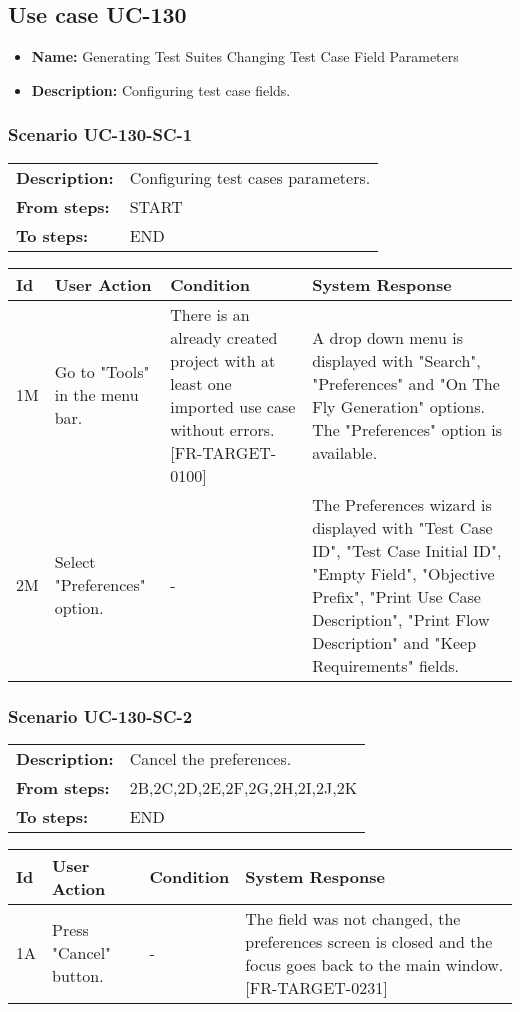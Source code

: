 \documentclass[a4paper,11pt]{article}
\newcommand{\bl}{\\ \hline}
\begin{document}
\subsection*{Use case UC-130}
\begin{itemize}
\item {\bf Name: }Generating Test Suites Changing Test Case Field Parameters
\item {\bf Description: }Configuring test case fields.
\end{itemize}
\subsubsection*{Scenario UC-130-SC-1}
\begin{tabular}{p{1in}p{4in}}
{\bf Description:} & Configuring test cases parameters. \\
{\bf From steps:} & START \\
{\bf To steps:} & END \\
\end{tabular}
 
\begin{tabular}{|p{0.8in}|p{1.6in}|p{1.6in}|p{1.6in}|}
\hline
Id & User Action & Condition & System Response  \bl 
1M & Go to "Tools" in the menu bar. & There is an already created project with at least one imported use case without errors. [FR-TARGET-0100] & A drop down menu is displayed with "Search", "Preferences" and "On The Fly Generation" options. The "Preferences" option is available. \bl 
2M & Select "Preferences" option. & - & The Preferences wizard is displayed with "Test Case ID", "Test Case Initial ID", "Empty Field", "Objective Prefix", "Print Use Case Description", "Print Flow Description" and "Keep Requirements" fields. \bl 
\end{tabular}
\subsubsection*{Scenario UC-130-SC-2}
\begin{tabular}{p{1in}p{4in}}
{\bf Description:} & Cancel the preferences. \\
{\bf From steps:} & 2B,2C,2D,2E,2F,2G,2H,2I,2J,2K \\
{\bf To steps:} & END \\
\end{tabular}
 
\begin{tabular}{|p{0.8in}|p{1.6in}|p{1.6in}|p{1.6in}|}
\hline
Id & User Action & Condition & System Response  \bl 
1A & Press "Cancel" button. & - & The field was not changed, the preferences screen is closed and the focus goes back to the main window. [FR-TARGET-0231] \bl 
\end{tabular}
\end{document}
